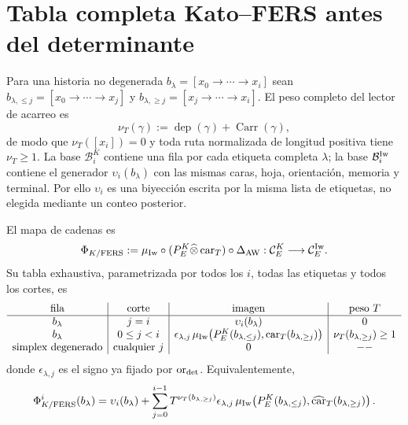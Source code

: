 \section{Tabla completa Kato--FERS antes del determinante}

Para una historia no degenerada
$b_\lambda=[x_0\to\cdots\to x_i]$ sean
$b_{\lambda,\le j}=[x_0\to\cdots\to x_j]$ y
$b_{\lambda,\ge j}=[x_j\to\cdots\to x_i]$. El peso completo del lector
de acarreo es
\begin{equation}\label{eq:pdf2-bsd-peso-t}
 \nu_T(\gamma):=\operatorname{dep}(\gamma)
                 +\operatorname{Carr}(\gamma),
\end{equation}
de modo que $\nu_T([x_i])=0$ y toda ruta normalizada de longitud positiva
tiene $\nu_T\ge1$. La base $\mathcal B_i^K$ contiene una fila por cada
etiqueta completa $\lambda$; la base $\mathcal B_i^{\rm Iw}$ contiene el
generador $\upsilon_i(b_\lambda)$ con las mismas caras, hoja, orientación,
memoria y terminal. Por ello $\upsilon_i$ es una biyección escrita por la
misma lista de etiquetas, no elegida mediante un conteo posterior.

El mapa de cadenas es
\begin{equation}\label{eq:pdf2-bsd-phi-kato}
 \Phi_{K/{\rm FERS}}:=
 \mu_{\rm Iw}\circ(P_E^K\widehat\otimes\operatorname{car}_T)
 \circ\Delta_{\rm AW}:
 \mathcal C_E^K\longrightarrow\mathcal C_E^{\rm Iw}.
\end{equation}
Su tabla exhaustiva, parametrizada por todos los $i$, todas las etiquetas y
todos los cortes, es
\begin{equation}\label{eq:pdf2-bsd-tabla-kato-fers}
\begin{array}{c|c|c|c}
 \text{fila}&\text{corte}&\text{imagen}&\text{peso }T\\ \hline
 b_\lambda&j=i&\upsilon_i(b_\lambda)&0\\
 b_\lambda&0\le j<i&
 \epsilon_{\lambda,j}\,
 \mu_{\rm Iw}\!\left(P_E^K(b_{\lambda,\le j}),
       \operatorname{car}_T(b_{\lambda,\ge j})\right)&
 \nu_T(b_{\lambda,\ge j})\ge1\\
 \text{simplex degenerado}&\text{cualquier }j&0&--
\end{array}
\end{equation}
donde $\epsilon_{\lambda,j}$ es el signo ya fijado por
$\operatorname{or}_{\rm det}$. Equivalentemente,
\begin{equation}\label{eq:pdf2-bsd-expansion-kato-fers}
 \Phi_{K/{\rm FERS}}^i(b_\lambda)
 =\upsilon_i(b_\lambda)+
  \sum_{j=0}^{i-1}T^{\nu_T(b_{\lambda,\ge j})}
  \epsilon_{\lambda,j}\,
  \mu_{\rm Iw}\!\left(P_E^K(b_{\lambda,\le j}),
          \widehat{\operatorname{car}}_T(b_{\lambda,\ge j})\right).
\end{equation}

